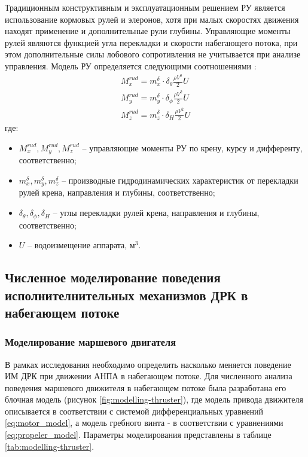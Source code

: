 Традиционным конструктивным и эксплуатационным решением РУ является использование кормовых рулей и элеронов, хотя при малых скоростях движения находят применение и дополнительные рули глубины.
Управляющие моменты рулей являются функцией угла перекладки и скорости набегающего потока, при этом дополнительные силы лобового сопротивления не учитывается при анализе управления.
Модель РУ определяется следующими соотношениями \cite{боженов1986}:
\begin{equation}
	\label{eq:modelling-rudder}
	\begin{array}{ll}
    M_x^{rud} = m_x^{\delta} \cdot \delta_{\theta} \frac{\rho V^2}{2} U \\
    M_y^{rud} = m_y^{\delta} \cdot \delta_{\phi} \frac{\rho V^2}{2} U \\
    M_z^{rud} = m_z^{\delta} \cdot \delta_{H} \frac{\rho V^2}{2} U
    \end{array}
\end{equation}
\noindent где:
\begin{itemize}
    \item $M_x^{rud}, M_y^{rud}, M_z^{rud}$ -- управляющие моменты РУ по крену, курсу и дифференту, соответственно;
    \item $m_x^{\delta}, m_y^{\delta}, m_z^{\delta}$ -- производные гидродинамических характеристик от перекладки рулей крена, направления и глубины, соответственно;
    \item $\delta_{\theta}, \delta_{\phi}, \delta_{H}$ -- углы перекладки рулей крена, направления и глубины, соответственно;
    \item $U$ -- водоизмещение аппарата, м$^3$.
\end{itemize}

\subsection{Численное моделирование поведения исполнителнительных механизмов ДРК в набегающем потоке}
\subsubsection{Моделирование маршевого двигателя}
В рамках исследования необходимо определить насколько меняется поведение ИМ ДРК при движении АНПА в набегающем потоке.
Для численного анализа поведения маршевого движителя в набегающем потоке была разработана его блочная модель (рисунок \ref{fig:modelling-thruster}), где модель привода движителя описывается в соответствии с системой дифференциальных уравнений \ref{eq:motor_model}, а модель гребного винта - в соответствии с уравнениями \ref{eq:propeler_model}.
Параметры моделирования представлены в таблице \ref{tab:modelling-thruster}.

